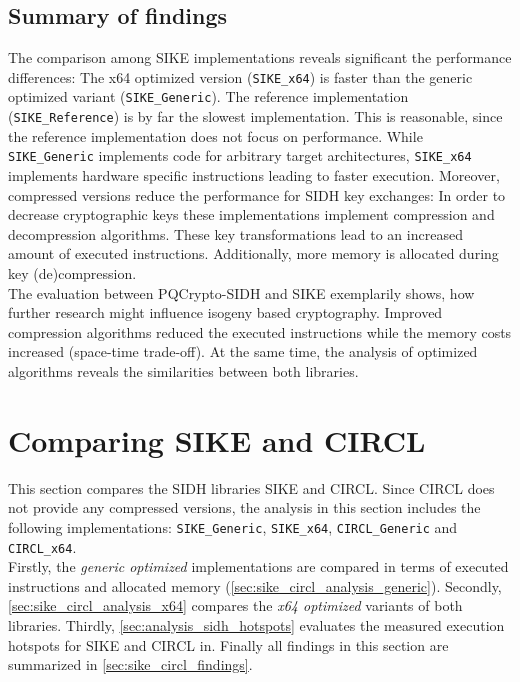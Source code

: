 \subsection{Summary of findings}\label{sec:findings_sike}
The comparison among \gls{SIKE} implementations reveals significant the performance differences: The x64 optimized version (\texttt{SIKE\_x64}) is faster than the generic optimized variant (\texttt{SIKE\_Generic}). The reference implementation (\texttt{SIKE\_Reference}) is by far the slowest implementation. This is reasonable, since the reference implementation does not focus on performance. While \texttt{SIKE\_Generic} implements code for arbitrary target architectures, \texttt{SIKE\_x64} implements hardware specific instructions leading to faster execution.  Moreover, compressed versions reduce the performance for \gls{SIDH} key exchanges: In order to decrease cryptographic keys these implementations implement compression and decompression algorithms. These key transformations lead to an increased amount of executed instructions. Additionally, more memory is allocated during key (de)compression.\\
The evaluation between \gls{PQCrypto-SIDH} and \gls{SIKE} exemplarily shows, how further research might influence isogeny based cryptography. Improved compression algorithms reduced the executed instructions while the memory costs increased (space-time trade-off). At the same time, the analysis of optimized algorithms reveals the similarities between both libraries.

\newpage
\section{Comparing \gls{SIKE} and \gls{CIRCL}} \label{sec:sike_vs_circl}

This section compares the SIDH libraries \gls{SIKE} and \gls{CIRCL}. Since \gls{CIRCL} does not provide any compressed versions, the analysis in this section includes the following implementations: \texttt{SIKE\_Generic}, \texttt{SIKE\_x64}, \texttt{CIRCL\_Generic} and \texttt{CIRCL\_x64}.\\
Firstly, the \textit{generic optimized} implementations are compared in terms of executed instructions and allocated memory (\autoref{sec:sike_circl_analysis_generic}). Secondly, \autoref{sec:sike_circl_analysis_x64} compares the \textit{x64 optimized} variants of both libraries. Thirdly,  \autoref{sec:analysis_sidh_hotspots} evaluates the measured execution hotspots for \gls{SIKE} and \gls{CIRCL} in. Finally all findings in this section are summarized in \autoref{sec:sike_circl_findings}. 

